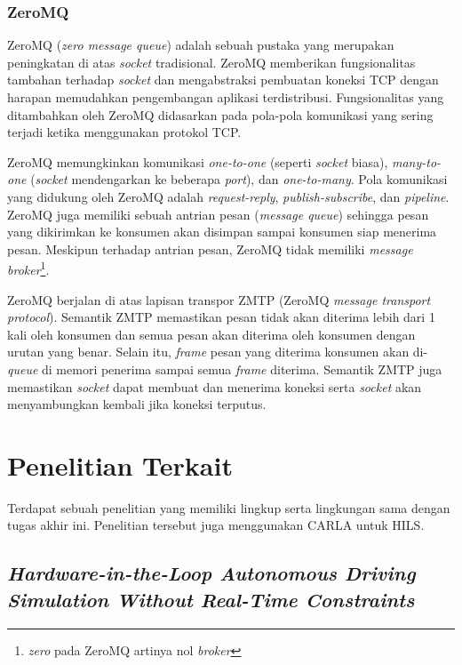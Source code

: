 \subsubsection{ZeroMQ}

ZeroMQ (\textit{zero message queue}) adalah sebuah pustaka yang merupakan
pe\-ning\-ka\-tan di atas \textit{socket} tradisional. ZeroMQ memberikan
fungsionalitas tambahan terhadap \textit{socket} dan mengabstraksi pembuatan
koneksi TCP dengan harapan memudahkan pengembangan aplikasi terdistribusi.
Fungsionalitas yang ditambahkan oleh ZeroMQ didasarkan pada pola-pola komunikasi
yang sering terjadi ketika menggunakan protokol TCP.

ZeroMQ memungkinkan komunikasi \textit{one-to-one} (seperti \textit{socket}
biasa), \textit{many-to-one} (\textit{socket} mendengarkan ke beberapa
\textit{port}), dan \textit{one-to-many}. Pola komunikasi yang didukung oleh
ZeroMQ adalah \textit{request-reply}, \textit{publish-subscribe}, dan
\textit{pipeline}. ZeroMQ juga memiliki sebuah antrian pesan (\textit{message
    queue}) sehingga pesan yang dikirimkan ke konsumen akan disimpan
sampai konsumen siap menerima pesan. Meskipun terhadap antrian pesan, ZeroMQ
tidak memiliki \textit{message broker}\footnote{\textit{zero} pada ZeroMQ
    artinya nol \textit{broker}}.

ZeroMQ berjalan di atas lapisan transpor ZMTP (ZeroMQ \textit{message transport
    protocol}). Semantik ZMTP memastikan pesan tidak akan diterima lebih dari 1 kali
oleh konsumen dan semua pesan akan diterima oleh konsumen dengan urutan yang
benar. Selain itu, \textit{frame} pesan yang diterima konsumen akan
di-\textit{queue} di memori penerima sampai semua \textit{frame} diterima.
Semantik ZMTP juga memastikan \textit{socket} dapat membuat dan menerima koneksi
serta \textit{socket} akan menyambungkan kembali jika koneksi terputus.

\section{Penelitian Terkait}

Terdapat sebuah penelitian yang memiliki lingkup serta lingkungan sama dengan
tugas akhir ini. Penelitian tersebut juga menggunakan CARLA untuk HILS.

\subsection{\textit{Hardware-in-the-Loop Autonomous Driving Simulation Without
        Real-Time Constraints}}


